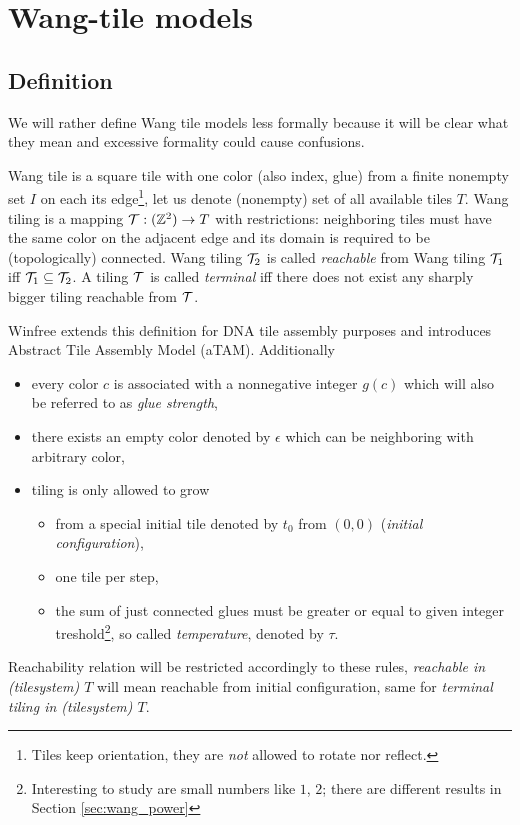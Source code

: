 
\section{Wang-tile models}

\subsection{Definition}
	
	
	We will rather define Wang tile models less formally because it will be clear what they mean and excessive formality could cause confusions.
	
	Wang tile is a square tile with one color (also index, glue) from a finite nonempty set $I$ on each its edge\footnote{Tiles keep orientation, they are {\em not} allowed to rotate nor reflect.}, let us denote (nonempty) set of all available tiles $T$. Wang tiling is a mapping ${\cal T}: (\mathbb{Z}^2) \rightarrow T$ with restrictions: neighboring tiles must have the same color on the adjacent edge and its domain is required to be (topologically) connected. Wang tiling ${\cal T}_2$ is called {\em reachable} from Wang tiling ${\cal T}_1$ iff ${\cal T}_1 \subseteq {\cal T}_2$. A tiling $\cal T$ is called {\em terminal} iff there does not exist any sharply bigger tiling reachable from $\cal T$. %
	
	Winfree extends this definition for DNA tile assembly purposes and introduces Abstract Tile Assembly Model (aTAM). Additionally
	\begin{itemize}
		\item every color $c$ is associated with a nonnegative integer $g(c)$ which will also be referred to as {\em glue strength},
		\item there exists an empty color denoted by $\epsilon$ which can be neighboring with arbitrary color,
		\item tiling is only allowed to grow
		\begin{itemize}
			\item from a special initial tile denoted by $t_0$ from $(0,0)$ ({\em initial configuration}),
			\item one tile per step,
			\item the sum of just connected glues must be greater or equal to given integer treshold\footnote{Interesting to study are small numbers like $1$, $2$; there are different results in Section \ref{sec:wang_power}}, so called {\em temperature}, denoted by $\tau$.
		\end{itemize}
	\end{itemize}
	Reachability relation will be restricted accordingly to these rules, {\em reachable in (tilesystem) $T$} will mean reachable from initial configuration, same for {\em terminal tiling in (tilesystem) $T$}.
	
